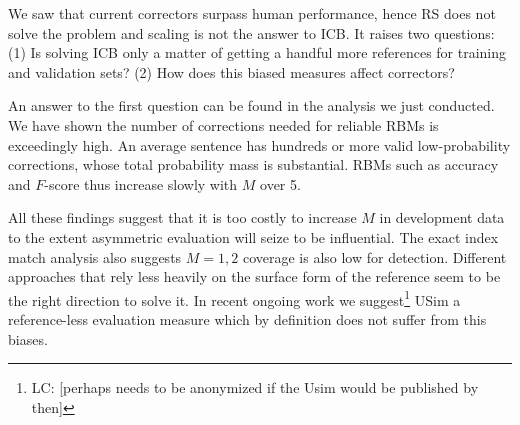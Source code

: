 \documentclass[a4paper, 11pt]{article}
\newcommand{\oa}[1]{\footnote{\color{red}OA: #1}}
\newcommand{\lc}[1]{\footnote{\color{blue}LC: #1}}
\begin{document}


We saw that current correctors surpass human performance, hence RS does not solve the problem and scaling is not the answer to ICB. It raises two questions: (1) Is solving ICB only a matter of getting a handful more references for training and validation sets? (2) How does this biased measures affect correctors?

An answer to the first question can be found in the analysis we just conducted. We have shown the number of corrections needed for reliable RBMs is exceedingly high.
An average sentence has hundreds or more valid low-probability corrections, whose total probability mass is substantial. 
RBMs such as accuracy and $F$-score thus increase slowly with $M$ over 5. 

All these findings suggest that it is too costly to increase $M$ in development data to the extent asymmetric evaluation will seize to be influential. The exact index match analysis also suggests $M=1,2$ coverage is also low for detection. Different approaches that rely less heavily on the surface form of the reference seem to be the right direction to solve it. In recent ongoing work we suggest\lc{[perhaps needs to be anonymized if the Usim would be published by then]} USim \citet{us} a reference-less evaluation measure which by definition does not suffer from this biases.
\end{document}
